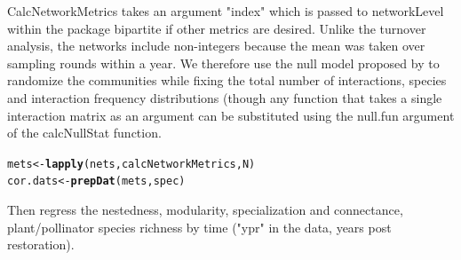 \documentclass{article}\usepackage[]{graphicx}\usepackage[]{color}
\makeatletter
\newcommand{\hlstd}[1]{\textcolor[rgb]{0.345,0.345,0.345}{#1}}%
\newcommand{\hlkwb}[1]{\textcolor[rgb]{0.69,0.353,0.396}{#1}}%
\newcommand{\hlkwd}[1]{\textcolor[rgb]{0.737,0.353,0.396}{\textbf{#1}}}%
\newenvironment{kframe}{%
 \def\at@end@of@kframe{}%
 \ifinner\ifhmode%
  \def\at@end@of@kframe{\end{minipage}}%
  \begin{minipage}{\columnwidth}%
 \fi\fi%
 \def\FrameCommand##1{\hskip\@totalleftmargin \hskip-\fboxsep
 \colorbox{shadecolor}{##1}\hskip-\fboxsep
     \hskip-\linewidth \hskip-\@totalleftmargin \hskip\columnwidth}%
 \MakeFramed {\advance\hsize-\width
   \@totalleftmargin\z@ \linewidth\hsize
   \@setminipage}}%
 {\par\unskip\endMakeFramed%
 \at@end@of@kframe}
\newenvironment{knitrout}{}{} %
\makeatother
\begin{document}
CalcNetworkMetrics takes an argument "index" which is passed to
networkLevel within the package bipartite \citep{bipartite} if other
metrics are desired. Unlike the turnover analysis, the networks
include non-integers because the mean was taken over sampling rounds
within a year. We therefore use the null model proposed by
\citep{Galeano2009} to randomize the communities while fixing the
total number of interactions, species and interaction frequency
distributions (though any function that takes a single interaction
matrix as an argument can be substituted using the null.fun argument
of the calcNullStat function.

\begin{knitrout}
\color{fgcolor}\begin{kframe}
\begin{alltt}
 \hlstd{mets} \hlkwb{<-} \hlkwd{lapply}\hlstd{(nets, calcNetworkMetrics, N)}
 \hlstd{cor.dats} \hlkwb{<-} \hlkwd{prepDat}\hlstd{(mets,  spec)}
\end{alltt}
\end{kframe}
\end{knitrout}

Then regress the nestedness, modularity, specialization and
connectance, plant/pollinator species richness by time ("ypr" in the
data, years post restoration).
\end{document}
